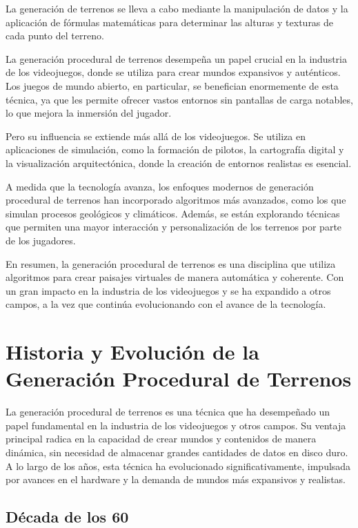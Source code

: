 La generación de terrenos se lleva a cabo mediante la manipulación de datos y la aplicación de fórmulas matemáticas para determinar las alturas y texturas de cada punto del terreno.

La generación procedural de terrenos desempeña un papel crucial en la industria de los videojuegos, donde se utiliza para crear mundos expansivos y auténticos. Los juegos de mundo abierto, en particular, se benefician enormemente de esta técnica, ya que les permite ofrecer vastos entornos sin pantallas de carga notables, lo que mejora la inmersión del jugador.

Pero su influencia se extiende más allá de los videojuegos. Se utiliza en aplicaciones de simulación, como la formación de pilotos, la cartografía digital y la visualización arquitectónica, donde la creación de entornos realistas es esencial.

A medida que la tecnología avanza, los enfoques modernos de generación procedural de terrenos han incorporado algoritmos más avanzados, como los que simulan procesos geológicos y climáticos. Además, se están explorando técnicas que permiten una mayor interacción y personalización de los terrenos por parte de los jugadores.

En resumen, la generación procedural de terrenos es una disciplina que utiliza algoritmos para crear paisajes virtuales de manera automática y coherente. Con un gran impacto en la industria de los videojuegos y se ha expandido a otros campos, a la vez que continúa evolucionando con el avance de la tecnología.

\section{Historia y Evolución de la Generación Procedural de Terrenos}

La generación procedural de terrenos es una técnica que ha desempeñado un papel fundamental en la industria de los videojuegos y otros campos. Su ventaja principal radica en la capacidad de crear mundos y contenidos de manera dinámica, sin necesidad de almacenar grandes cantidades de datos en disco duro. A lo largo de los años, esta técnica ha evolucionado significativamente, impulsada por avances en el hardware y la demanda de mundos más expansivos y realistas.

\subsection{Década de los 60}


